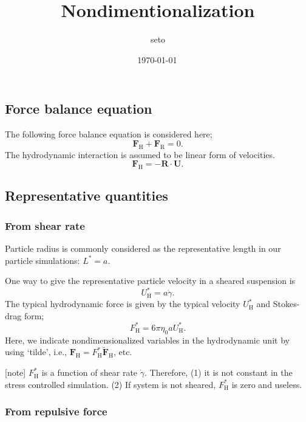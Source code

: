 \documentclass[fontsize=11pt]{scrartcl}
\title{Nondimentionalization}
\date{\shortdate\today \, \ampmtime }
\author{seto}
\begin{document}
\maketitle

\subsection*{Force balance equation}

The following force balance equation is considered here;
\begin{equation}
 \bm{F}_{\mathrm{H}} +  \bm{F}_{\mathrm{R}}  = 0.
\end{equation}
%
The hydrodynamic interaction is
assumed to be linear form of velocities.
%
\begin{equation}
 \bm{F}_{\mathrm{H}} = - \bm{R}\cdot\bm{U}.
\end{equation}

\subsection*{Representative quantities}

\subsubsection*{From shear rate}
Particle radius is commonly considered
as the representative length in
our particle simulations: $L^{\ast} = a$.

One way to give the representative particle velocity
in a sheared suspension is
\begin{equation}
U_{\mathrm{H}}^{\ast} = a \dot{\gamma}.
\end{equation}
%
%
The typical hydrodynamic force is given
by the typical velocity $U_{\mathrm{H}}^{\ast} $
and Stokes-drag form;
\begin{equation}
  F_{\mathrm{H}}^{\ast} = 6 \pi \eta_0 a U_{\mathrm{H}}^{\ast}.
\end{equation}
Here, we indicate nondimensionalized variables
in the hydrodynamic unit by using `tilde',
i.e.,
$\bm{F}_{\mathrm{H}} = F_{\mathrm{H}}^{\ast} \tilde{\bm{F}}_{\mathrm{H}} $,
etc.
%

[note]
$F_{\mathrm{H}}^{\ast}$ is a function of shear rate $\dot{\gamma}$.
%
Therefore,
(1) it is not constant in the stress controlled simulation.
(2) If system is not sheared,
  $F_{\mathrm{H}}^{\ast} $ is zero and useless.



\subsubsection*{From repulsive force}
\end{document}
